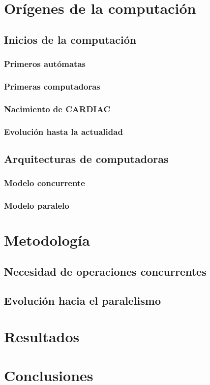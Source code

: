 \documentclass[letterpaper,12pt,oneside]{book}
\begin{document}
\tableofcontents
\listoffigures

\mainmatter

\chapter{Orígenes de la computación} %


\section{Inicios de la computación}
	\subsection{Primeros autómatas}
	\subsection{Primeras computadoras}
	\subsection{Nacimiento de CARDIAC}
	\subsection{Evolución hasta la actualidad}
   
\section{Arquitecturas de computadoras}   
   
\subsection{Modelo concurrente}

\subsection{Modelo paralelo}


\chapter{Metodología}  %
	\section{Necesidad de operaciones concurrentes}
	
	 \section{Evolución hacia el paralelismo}

\chapter{Resultados}  %


\chapter{Conclusiones}

%
%

\end{document}
